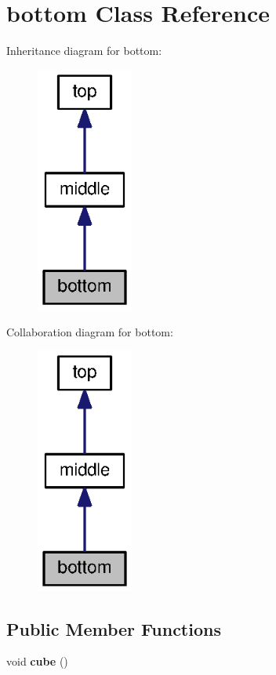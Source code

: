 \section{bottom Class Reference}
\label{classbottom}


Inheritance diagram for bottom\-:\nopagebreak
\begin{figure}[H]
\begin{center}
\leavevmode
\includegraphics[width=90pt]{classbottom__inherit__graph}
\end{center}
\end{figure}


Collaboration diagram for bottom\-:\nopagebreak
\begin{figure}[H]
\begin{center}
\leavevmode
\includegraphics[width=90pt]{classbottom__coll__graph}
\end{center}
\end{figure}
\subsection*{Public Member Functions}
\begin{DoxyCompactItemize}
\item 
void {\bf cube} ()
\end{DoxyCompactItemize}
